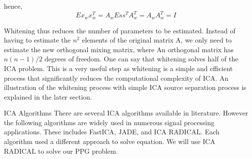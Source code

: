 \begin{compactitem}
hence,
\begin{equation}
\label{eq:ica-CoVI}
E{x_w x^T_w } = A_w E{s s^T }A^T_w
= A_w A^T_w = I
\end{equation}

Whitening thus reduces the number of parameters to be
estimated. Instead of having to estimate the $n^2$ elements of
the original matrix A, we only need to estimate the new orthogonal
mixing matrix, where An orthogonal matrix has
$n(n-1)/2$ degrees of freedom. One can say that whitening
solves half of the ICA problem. This is a very useful step
as whitening is a simple and efficient process that significantly
reduces the computational complexity of ICA. An illustration
of the whitening process with simple ICA source
separation process is explained in the later section.

\item {ICA Algorithms}
There are several ICA algorithms available in literature.
However the following algorithms are widely used
in numerous signal processing applications. These includes
FastICA, JADE, and ICA RADICAL. Each algorithm used a different
approach to solve equation. We will use ICA RADICAL \cite{radical-ica} to solve our PPG problem.

\end{compactitem}


